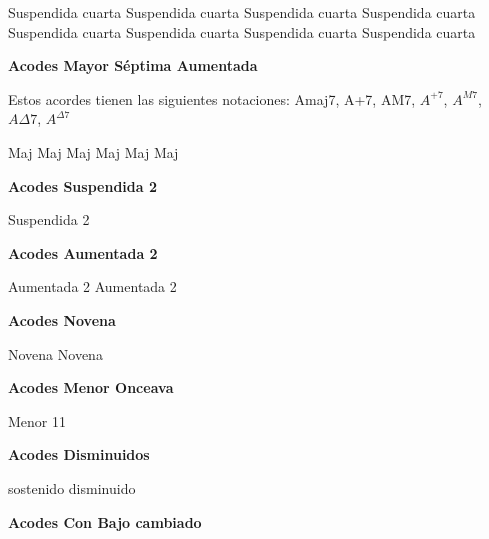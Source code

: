 \small
{} Suspendida cuarta  \qquad\qquad
{} Suspendida cuarta \qquad\qquad
{} Suspendida cuarta
\vskip 25pt
 Suspendida cuarta \qquad\qquad
{} Suspendida cuarta \qquad\qquad
{} Suspendida cuarta
\vskip 25pt
 Suspendida cuarta \qquad\qquad
{} Suspendida cuarta
\normalsize

\vskip 20pt
\textbf{Acodes Mayor S\'eptima Aumentada}
\vskip 25pt

Estos acordes tienen las siguientes notaciones:
Amaj7, A+7, AM7, $A^{+7}$, $A^{M7}$, $A\Delta7$, $A^{\Delta7}$\break
\vskip 20pt

\small
{} Maj \hfill
{} Maj \hfill
{} Maj \hfill\null\break
\vskip 20pt
 Maj \hfill
{} Maj \hfill
{} Maj \hfill\null\break
\normalsize

\vskip 20pt
\textbf{Acodes Suspendida 2}
\vskip 25pt

\small
{} Suspendida 2
\normalsize

\vskip 20pt
\textbf{Acodes Aumentada 2}
\vskip 25pt

\small
{} Aumentada 2
 Aumentada 2
\normalsize


\vskip 20pt
\textbf{Acodes Novena}
\vskip 25pt

\small
{} Novena
 Novena
\normalsize

\vskip 20pt
\textbf{Acodes Menor Onceava}
\vskip 25pt

\small
{} Menor 11
\normalsize


\vskip 20pt
\textbf{Acodes Disminuidos}
\vskip 25pt

\small
{} sostenido disminuido
\normalsize


\vskip 20pt
\textbf{Acodes Con Bajo cambiado}
\vskip 25pt


